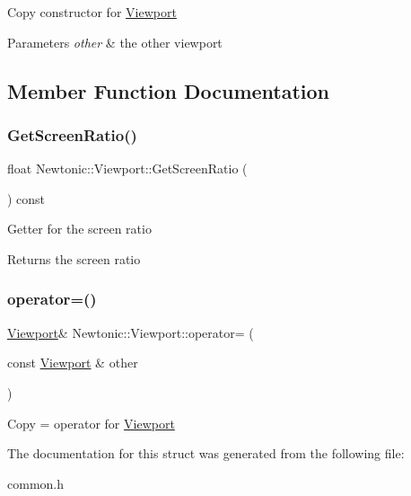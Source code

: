 Copy constructor for \mbox{\hyperlink{structNewtonic_1_1Viewport}{Viewport}} 
\begin{DoxyParams}{Parameters}
{\em other} & the other viewport \\
\hline
\end{DoxyParams}


\subsection{Member Function Documentation}
\mbox{\label{structNewtonic_1_1Viewport_a1fcd707acdf91d581545fcf9666a53c8}} 
\subsubsection{\texorpdfstring{GetScreenRatio()}{GetScreenRatio()}}
{\footnotesize\ttfamily float Newtonic\+::\+Viewport\+::\+Get\+Screen\+Ratio (\begin{DoxyParamCaption}{ }\end{DoxyParamCaption}) const\hspace{0.3cm}{\ttfamily [inline]}}

Getter for the screen ratio \begin{DoxyReturn}{Returns}
the screen ratio 
\end{DoxyReturn}
\mbox{\label{structNewtonic_1_1Viewport_a72ea15f2b704e425e09c36b552a37d71}} 
\subsubsection{\texorpdfstring{operator=()}{operator=()}}
{\footnotesize\ttfamily \mbox{\hyperlink{structNewtonic_1_1Viewport}{Viewport}}\& Newtonic\+::\+Viewport\+::operator= (\begin{DoxyParamCaption}\item[{const \mbox{\hyperlink{structNewtonic_1_1Viewport}{Viewport}} \&}]{other }\end{DoxyParamCaption})\hspace{0.3cm}{\ttfamily [inline]}}

Copy = operator for \mbox{\hyperlink{structNewtonic_1_1Viewport}{Viewport}} 

The documentation for this struct was generated from the following file\+:\begin{DoxyCompactItemize}
\item 
common.\+h\end{DoxyCompactItemize}
